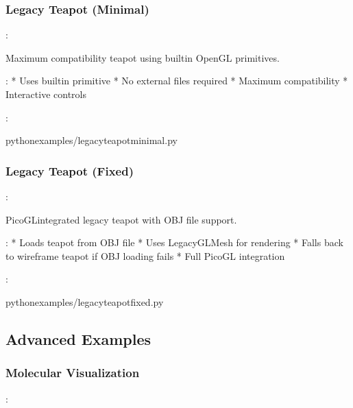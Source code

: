 \documentclass[a4paper,10pt,english,openany,oneside]{sphinxmanual}
\begin{document}
\subsubsection{Legacy Teapot (Minimal)}
\label{\detokenize{examples:legacy-teapot-minimal}}
\sphinxAtStartPar
{}: 

\sphinxAtStartPar
Maximum compatibility teapot using built\sphinxhyphen{}in OpenGL primitives.

\sphinxAtStartPar
{}:
* Uses  built\sphinxhyphen{}in primitive
* No external files required
* Maximum compatibility
* Interactive controls

\sphinxAtStartPar
{}:

\begin{sphinxVerbatim}[commandchars=\\\{\}]
pythonexamples/legacy\PYGZus{}teapot\PYGZus{}minimal.py
\end{sphinxVerbatim}


\subsubsection{Legacy Teapot (Fixed)}
\label{\detokenize{examples:legacy-teapot-fixed}}
\sphinxAtStartPar
{}: 

\sphinxAtStartPar
PicoGL\sphinxhyphen{}integrated legacy teapot with OBJ file support.

\sphinxAtStartPar
{}:
* Loads teapot from OBJ file
* Uses LegacyGLMesh for rendering
* Falls back to wireframe teapot if OBJ loading fails
* Full PicoGL integration

\sphinxAtStartPar
{}:

\begin{sphinxVerbatim}[commandchars=\\\{\}]
pythonexamples/legacy\PYGZus{}teapot\PYGZus{}fixed.py
\end{sphinxVerbatim}


\subsection{Advanced Examples}
\label{\detokenize{examples:advanced-examples}}

\subsubsection{Molecular Visualization}
\label{\detokenize{examples:molecular-visualization}}
\sphinxAtStartPar
{}: 
\end{document}
